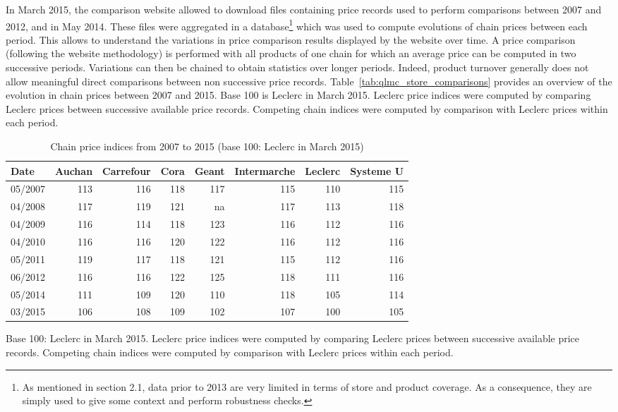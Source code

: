 \documentclass[english]{article}
\begin{document}
In March 2015, the comparison website allowed to download files containing price records used to perform comparisons between 2007 and 2012, and in May 2014. These files were aggregated in a database\footnote{As mentioned in section 2.1, data prior to 2013 are very limited in terms of store and product coverage. As a consequence, they are simply used to give some context and perform robustness checks.} which was used to compute evolutions of chain prices between each period. This allows to understand the variations in price comparison results displayed by the website over time. A price comparison (following the website methodology) is performed with all products of one chain for which an average price can be computed in two successive periods. Variations can then be chained to obtain statistics over longer periods. Indeed, product turnover generally does not allow meaningful direct comparisons between non successive price records. Table~\ref{tab:qlmc_store_comparisons} provides an overview of the evolution in chain prices between 2007 and 2015. Base 100 is Leclerc in March 2015. Leclerc price indices were computed by comparing Leclerc prices between successive available price records. Competing chain indices were computed by comparison with Leclerc prices within each period.

\begin{table}
\caption{Chain price indices from 2007 to 2015 (base 100: Leclerc in March 2015)}
\label{tab:qlmc_comparison_history}
\begin{threeparttable}
\begin{tabular}{lrrrrrrr}
    \toprule
    \toprule
    Date & Auchan & Carrefour & Cora  & Geant & Intermarche & Leclerc & Systeme U \\
    \midrule
    05/2007 & 113   & 116   & 118   & 117   & 115   & 110   & 115 \\
    04/2008 & 117   & 119   & 121   & na    & 117   & 113   & 118 \\
    04/2009 & 116   & 114   & 118   & 123   & 116   & 112   & 116 \\
    04/2010 & 116   & 116   & 120   & 122   & 116   & 112   & 116 \\
    05/2011 & 119   & 117   & 118   & 121   & 115   & 112   & 116 \\
    06/2012 & 116   & 116   & 122   & 125   & 118   & 111   & 116 \\
    05/2014 & 111   & 109   & 120   & 110   & 118   & 105   & 114 \\
    03/2015 & 106   & 108   & 109   & 102   & 107   & 100   & 105 \\
    \bottomrule
    \bottomrule
    \end{tabular}
\begin{tablenotes}
      \small
      \item Base 100: Leclerc in March 2015. Leclerc price indices were computed by comparing Leclerc prices between successive available price records. Competing chain indices were computed by comparison with Leclerc prices within each period.
\end{tablenotes}
\end{threeparttable}
\end{table}
\end{document}
